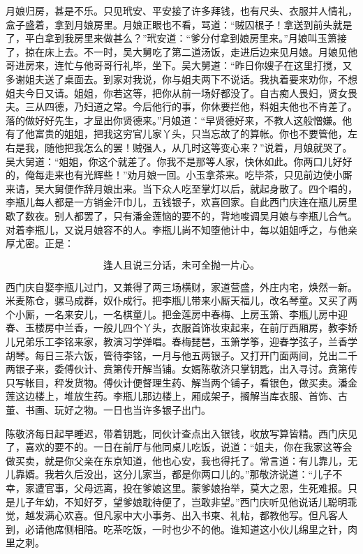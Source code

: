 月娘归房，甚是不乐。只见玳安、平安接了许多拜钱，也有尺头、衣服并人情礼，盒子盛着，拿到月娘房里。月娘正眼也不看，骂道：“贼囚根子！拿送到前头就是了，平白拿到我房里来做甚么？”玳安道：“爹分付拿到娘房里来。”月娘叫玉箫接了，掠在床上去。不一时，吴大舅吃了第二道汤饭，走进后边来见月娘。月娘见他哥进房来，连忙与他哥哥行礼毕，坐下。吴大舅道：“昨日你嫂子在这里打搅，又多谢姐夫送了桌面去。到家对我说，你与姐夫两下不说话。我执着要来劝你，不想姐夫今日又请。姐姐，你若这等，把你从前一场好都没了。自古痴人畏妇，贤女畏夫。三从四德，乃妇道之常。今后他行的事，你休要拦他，料姐夫他也不肯差了。落的做好好先生，才显出你贤德来。”月娘道：“早贤德好来，不教人这般憎嫌。他有了他富贵的姐姐，把我这穷官儿家丫头，只当忘故了的算帐。你也不要管他，左右是我，随他把我怎么的罢！贼强人，从几时这等变心来？”说着，月娘就哭了。吴大舅道：“姐姐，你这个就差了。你我不是那等人家，快休如此。你两口儿好好的，俺每走来也有光辉些！”劝月娘一回。小玉拿茶来。吃毕茶，只见前边使小厮来请，吴大舅便作辞月娘出来。当下众人吃至掌灯以后，就起身散了。四个唱的，李瓶儿每人都是一方销金汗巾儿，五钱银子，欢喜回家。自此西门庆连在瓶儿房里歇了数夜。别人都罢了，只有潘金莲恼的要不的，背地唆调吴月娘与李瓶儿合气。对着李瓶儿，又说月娘容不的人。李瓶儿尚不知堕他计中，每以姐姐呼之，与他亲厚尤密。正是：

\[
逢人且说三分话，未可全抛一片心。
\]

西门庆自娶李瓶儿过门，又兼得了两三场横财，家道营盛，外庄内宅，焕然一新。米麦陈仓，骡马成群，奴仆成行。把李瓶儿带来小厮天福儿，改名琴童。又买了两个小厮，一名来安儿，一名棋童儿。把金莲房中春梅、上房玉箫、李瓶儿房中迎春、玉楼房中兰香，一般儿四个丫头，衣服首饰妆束起来，在前厅西厢房，教李娇儿兄弟乐工李铭来家，教演习学弹唱。春梅琵琶，玉箫学筝，迎春学弦子，兰香学胡琴。每日三茶六饭，管待李铭，一月与他五两银子。又打开门面两间，兑出二千两银子来，委傅伙计、贲第传开解当铺。女婿陈敬济只掌钥匙，出入寻讨。贲第传只写帐目，秤发货物。傅伙计便督理生药、解当两个铺子，看银色，做买卖。潘金莲这边楼上，堆放生药。李瓶儿那边楼上，厢成架子，搁解当库衣服、首饰、古董、书画、玩好之物。一日也当许多银子出门。

陈敬济每日起早睡迟，带着钥匙，同伙计查点出入银钱，收放写算皆精。西门庆见了，喜欢的要不的。一日在前厅与他同桌儿吃饭，说道：“姐夫，你在我家这等会做买卖，就是你父亲在东京知道，他也心安，我也得托了。常言道：有儿靠儿，无儿靠婿。我若久后没出，这分儿家当，都是你两口儿的。”那敬济说道：“儿子不幸，家遭官事，父母远离，投在爹娘这里。蒙爹娘抬举，莫大之恩，生死难报。只是儿子年幼，不知好歹，望爹娘耽待便了，岂敢非望。”西门庆听见他说话儿聪明乖觉，越发满心欢喜。但凡家中大小事务、出入书柬、礼帖，都教他写。但凡客人到，必请他席侧相陪。吃茶吃饭，一时也少不的他。谁知道这小伙儿绵里之针，肉里之刺。

